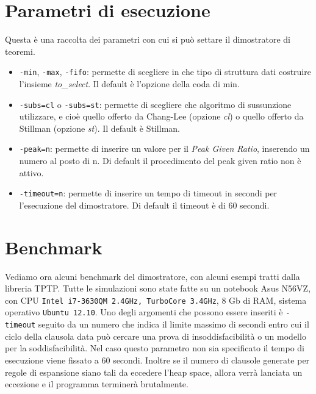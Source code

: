 \documentclass[a4paper,11pt]{article}
\begin{document}
\section{Parametri di esecuzione}
Questa è una raccolta dei parametri con cui si può settare il dimostratore di teoremi.
\begin{itemize}
\item \texttt{-min}, \texttt{-max}, \texttt{-fifo}: permette di scegliere in che tipo di struttura dati costruire l'insieme \emph{to\_select}. Il default è l'opzione della coda di min.
\item \texttt{-subs=cl} o \texttt{-subs=st}: permette di scegliere che algoritmo di sussunzione utilizzare, e cioè quello offerto da Chang-Lee (opzione \emph{cl}) o quello offerto da Stillman (opzione \emph{st}). Il default è Stillman.
\item \texttt{-peak=n}: permette di inserire un valore per il \emph{Peak Given Ratio}, inserendo un numero al posto di n. Di default il procedimento del peak given ratio non è attivo.
\item \texttt{-timeout=n}: permette di inserire un tempo di timeout in secondi per l'esecuzione del dimostratore. Di default il timeout è di 60 secondi.
\end{itemize}

\section{Benchmark}
Vediamo ora alcuni benchmark del dimostratore, con alcuni esempi tratti dalla libreria TPTP. Tutte le simulazioni sono state fatte su un notebook Asus N56VZ, con CPU \texttt{Intel i7-3630QM 2.4GHz, TurboCore 3.4GHz}, 8 Gb di RAM, sistema operativo \texttt{Ubuntu 12.10}.
Uno degli argomenti che possono essere inseriti è \texttt{-timeout} seguito da un numero che indica il limite massimo di secondi entro cui il ciclo della clausola data può cercare una prova di insoddisfacibilità o un modello per la soddisfacibilità. Nel caso questo parametro non sia specificato il tempo di esecuzione viene fissato a 60 secondi. Inoltre se il numero di clausole generate per regole di espansione siano tali da eccedere l'heap space, allora verrà lanciata un eccezione e il programma terminerà brutalmente.\par
\end{document}
